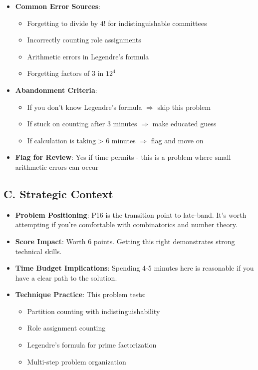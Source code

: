 \documentclass[12pt]{article}
\begin{document}
\begin{competitionbox}
\begin{itemize}[leftmargin=*]
    \item \textbf{Common Error Sources}:
    \begin{itemize}
        \item Forgetting to divide by $4!$ for indistinguishable committees
        \item Incorrectly counting role assignments
        \item Arithmetic errors in Legendre's formula
        \item Forgetting factors of 3 in $12^4$
    \end{itemize}
    
    \item \textbf{Abandonment Criteria}: 
    \begin{itemize}
        \item If you don't know Legendre's formula $\Rightarrow$ skip this problem
        \item If stuck on counting after 3 minutes $\Rightarrow$ make educated guess
        \item If calculation is taking > 6 minutes $\Rightarrow$ flag and move on
    \end{itemize}
    
    \item \textbf{Flag for Review}: Yes if time permits - this is a problem where small arithmetic errors can occur
\end{itemize}

\subsection*{C. Strategic Context}
\begin{itemize}[leftmargin=*]
    \item \textbf{Problem Positioning}: P16 is the transition point to late-band. It's worth attempting if you're comfortable with combinatorics and number theory.
    
    \item \textbf{Score Impact}: Worth 6 points. Getting this right demonstrates strong technical skills.
    
    \item \textbf{Time Budget Implications}: Spending 4-5 minutes here is reasonable if you have a clear path to the solution.
    
    \item \textbf{Technique Practice}: This problem tests:
    \begin{itemize}
        \item Partition counting with indistinguishability
        \item Role assignment counting
        \item Legendre's formula for prime factorization
        \item Multi-step problem organization
    \end{itemize}
\end{itemize}
\end{competitionbox}
\end{document}
